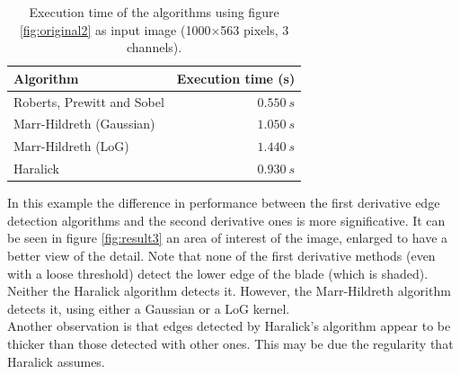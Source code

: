\documentclass{ipol}
\numberwithin{equation}{section}
\numberwithin{table}{section}
\numberwithin{figure}{section}
\begin{document}
\begin{table}[h!]
	\begin{center}
	\begin{tabular}{| l | r |}
		\hline \rule{0pt}{3ex}
		\cellcolor[gray]{0.8} \textbf{Algorithm}	& \cellcolor[gray]{0.8} \textbf{Execution time (s)}	\\ \hline \rule{0pt}{3ex}
		Roberts, Prewitt and Sobel					& $0.550 \ s$										\\ \hline \rule{0pt}{3ex}
		Marr-Hildreth (Gaussian)					& $1.050 \ s$										\\ \hline \rule{0pt}{3ex}
		Marr-Hildreth (LoG)							& $1.440 \ s$										\\ \hline \rule{0pt}{3ex}
		Haralick									& $0.930 \ s$										\\
		\hline
	\end{tabular}
	\end{center}
	\caption{Execution time of the algorithms using figure \ref{fig:original2} as input image (1000$\times$563 pixels, 3 channels).}
	\label{exectime2}
\end{table}

In this example the difference in performance between the first derivative edge detection algorithms and the second derivative ones is more significative. It can be seen in figure \ref{fig:result3} an area of ​​interest of the image, enlarged to have a better view of the detail. Note that none of the first derivative methods (even with a loose threshold) detect the lower edge of the blade (which is shaded). Neither the Haralick algorithm detects it. However, the Marr-Hildreth algorithm detects it, using either a Gaussian or a LoG kernel. \\

Another observation is that edges detected by Haralick's algorithm appear to be thicker than those detected with other ones. This may be due the regularity that Haralick assumes. \\
\end{document}
